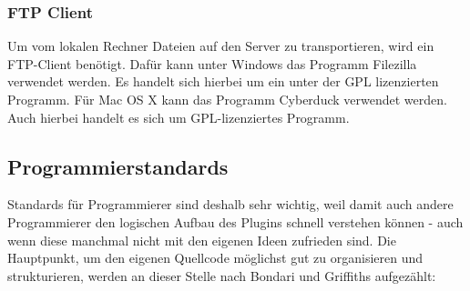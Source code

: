 \subsubsection{FTP Client}
Um vom lokalen Rechner Dateien auf den Server zu transportieren, wird ein \gls{FTP}-Client benötigt. Dafür kann unter Windows das Programm Filezilla verwendet werden. Es handelt sich hierbei um ein unter der \gls{GPL} lizenzierten Programm. \newline
Für Mac OS X kann das Programm Cyberduck verwendet werden. Auch hierbei handelt es sich um \gls{GPL}-lizenziertes Programm.
\subsection{Programmierstandards}\label{PRST}
Standards für Programmierer sind deshalb sehr wichtig, weil damit auch andere Programmierer den logischen Aufbau des Plugins schnell verstehen können - auch wenn diese manchmal nicht mit den eigenen Ideen zufrieden sind. Die Hauptpunkt, um den eigenen Quellcode möglichst gut zu organisieren und strukturieren, werden an dieser Stelle nach Bondari und Griffiths aufgezählt:
